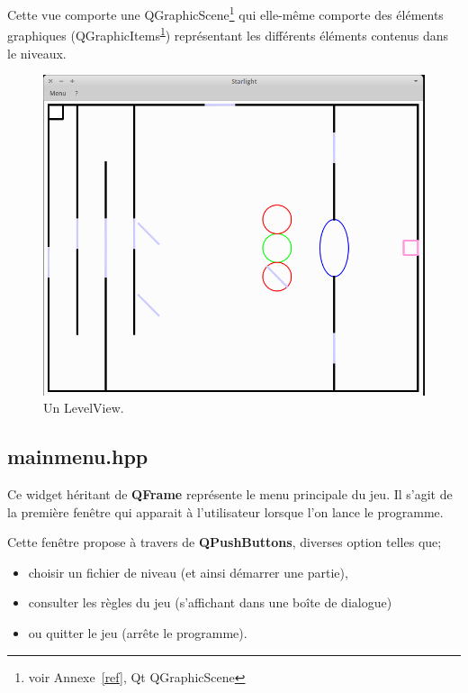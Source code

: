 \documentclass[a4paper,11pt]{report}
\begin{document}
Cette vue comporte une QGraphicScene\footnote{\label{qgs}voir Annexe~\ref{ref},
Qt QGraphicScene} qui elle-même comporte des éléments graphiques 
(QGraphicItems\textsuperscript{\ref{qgs}}) représentant les différents éléments contenus
dans le niveaux. 

\begin{figure}[h!]
	\caption{Un LevelView.}
	\centering
	\includegraphics[keepaspectratio=true,width=0.7\linewidth]{./screenshots/level_view}
\end{figure}

\subsection[Le menu]{mainmenu.hpp}
Ce widget héritant de \textbf{QFrame} représente le menu principale du jeu. Il s'agit de
la première fenêtre qui apparait à l'utilisateur lorsque l'on lance le
programme. 

Cette fenêtre propose à travers de \textbf{QPushButtons}, diverses option
telles que; 
\begin{itemize}
	\item choisir un fichier de niveau (et ainsi démarrer une partie),
	\item consulter les règles du jeu (s'affichant dans une boîte de dialogue) 
	\item ou quitter le jeu (arrête le programme).
\end{itemize}
\end{document}
